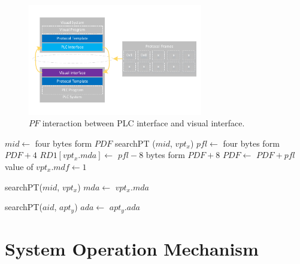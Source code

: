 \documentclass[journal,UTF8]{IEEEtran}
\begin{document}
\begin{figure}
	\centering
	\includegraphics[width=3in]{fig/FlexibleLayer.pdf}
	\caption{ $PF$ interaction between PLC interface and visual interface.}
	\label{fig:FlexibleLayer}
\end{figure}
\begin{algorithm}
	\label{alg4}
	\caption{$VLDeframing$}%
    $mid \leftarrow$ four bytes form $PDF$\;
    searchPT ($mid$, $vpt_x$)\;
    $pfl \leftarrow$ four bytes form $PDF+4$\; 
    $RD1[vpt_x.mda]\leftarrow$ $pfl-8$ bytes form $PDF+8$\;     	
	$PDF\leftarrow$ $PDF+pfl$\;
	value of $vpt_x.mdf\leftarrow 1$\;
\end{algorithm}

\begin{algorithm}
	\label{alg5}
	\caption{$CLDeframing$}%
	searchPT($mid$, $vpt_x$)\;
	$mda\leftarrow$ $vpt_x.mda$\;	
\end{algorithm}

\begin{algorithm}
	\label{alg6}
	\caption{$ALDeframing$}%
	searchPT($aid$, $apt_y$)\;
	$ada\leftarrow$ $apt_y.ada$\;
\end{algorithm}


\section{System Operation Mechanism}
\label{Execution}
\end{document}
